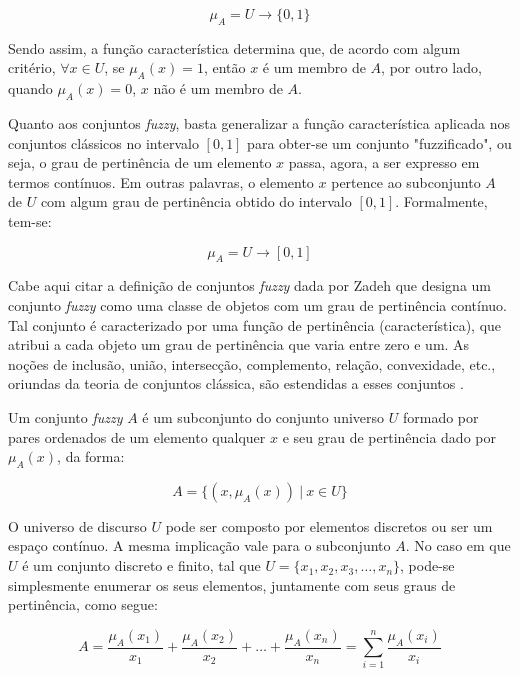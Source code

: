\begin{equation}
  \mu_A =  U \rightarrow \{0, 1\}
\end{equation}

Sendo assim, a função característica determina que, de acordo com algum critério, $\forall x \in U$, se $\mu_A(x) = 1$, então $x$ é um membro de $A$, por outro lado, quando $\mu_A(x) = 0$, $x$ não é um membro de $A$.

Quanto aos conjuntos \emph{fuzzy}, basta generalizar a função característica aplicada nos conjuntos clássicos no intervalo $[0, 1]$ para obter-se um conjunto "fuzzificado", ou seja, o grau de pertinência de um elemento $x$ passa, agora, a ser expresso em termos contínuos. Em outras palavras, o elemento $x$ pertence ao subconjunto $A$ de $U$ com algum grau de pertinência obtido do intervalo $[0, 1]$. Formalmente, tem-se:

\begin{equation}
  \mu_A =  U \rightarrow [0, 1]
\end{equation}

Cabe aqui citar a definição de conjuntos \emph{fuzzy} dada por Zadeh que designa um conjunto \emph{fuzzy} como uma classe de objetos com um grau de pertinência contínuo. Tal conjunto é caracterizado por uma função de pertinência (característica), que atribui a cada objeto um grau de pertinência que varia entre zero e um. As noções de inclusão, união, intersecção, complemento, relação, convexidade, etc., oriundas da teoria de conjuntos clássica, são estendidas a esses conjuntos \citep{zadeh:65}.

\begin{defn}
Um conjunto \emph{fuzzy} $A$ é um subconjunto do conjunto universo $U$ formado por pares ordenados de um elemento qualquer $x$ e seu grau de pertinência dado por $\mu_A(x)$, da forma:

\begin{equation}
  A =  \{(x, \mu_A(x)) \ |\ x \in U\}
\end{equation}
\end{defn}

O universo de discurso $U$ pode ser composto por elementos discretos ou ser um espaço contínuo. A mesma implicação vale para o subconjunto $A$. No caso em que $U$ é um conjunto discreto e finito, tal que $U = \{x_1, x_2, x_3, \ldots, x_n\}$, pode-se simplesmente enumerar os seus elementos, juntamente com seus graus de pertinência, como segue:

\begin{equation}
  A =  \frac{\mu_A(x_1)}{x_1} + \frac{\mu_A(x_2)}{x_2} + \ldots + \frac{\mu_A(x_n)}{x_n} = \sum_{i=1}^n \frac{\mu_A(x_i)}{x_i}
\label{equ:conjunto_fuzzy_finito}
\end{equation}

